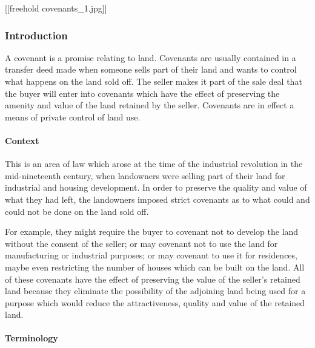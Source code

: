 \documentclass[
]{article}
\newenvironment{Shaded}{}{}
\newcommand{\NormalTok}[1]{#1}
\begin{document}
{[}{[}freehold covenants\_1.jpg{]}{]}

\hypertarget{introduction-1}{%
\subsubsection{Introduction}\label{introduction-1}}

A covenant is a promise relating to land. Covenants are usually
contained in a transfer deed made when someone sells part of their land
and wants to control what happens on the land sold off. The seller makes
it part of the sale deal that the buyer will enter into covenants which
have the effect of preserving the amenity and value of the land retained
by the seller. Covenants are in effect a means of private control of
land use.

\hypertarget{context}{%
\paragraph{Context}\label{context}}

This is an area of law which arose at the time of the industrial
revolution in the mid-nineteenth century, when landowners were selling
part of their land for industrial and housing development. In order to
preserve the quality and value of what they had left, the landowners
imposed strict covenants as to what could and could not be done on the
land sold off.

\begin{Shaded}
\begin{Highlighting}[]
\NormalTok{For example, they might require the buyer to covenant not to develop the land without the consent of the seller; or may covenant not to use the land for manufacturing or industrial purposes; or may covenant to use it for residences, maybe even restricting the number of houses which can be built on the land. All of these covenants have the effect of preserving the value of the seller’s retained land because they eliminate the possibility of the adjoining land being used for a purpose which would reduce the attractiveness, quality and value of the retained land.}
\end{Highlighting}
\end{Shaded}

\hypertarget{terminology}{%
\paragraph{Terminology}\label{terminology}}
\end{document}
